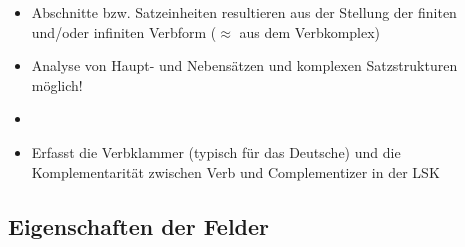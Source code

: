 \begin{frame}

\begin{itemize}
	\item Abschnitte bzw. Satzeinheiten resultieren aus der Stellung der finiten und/oder infiniten Verbform ($\approx$ aus dem Verbkomplex)
\end{itemize}

\begin{table}
\centering
{}
\end{table}

\end{frame}


\begin{frame}

\begin{itemize}
	\item Analyse von Haupt- und Nebensätzen und komplexen Satzstrukturen möglich!
	\item[]
	\item Erfasst die Verbklammer (typisch für das Deutsche) und
	die Komplementarität zwischen Verb und Complementizer in der LSK
\end{itemize}

\begin{table}
\centering
{}
\end{table}

\end{frame}


\subsection{Eigenschaften der Felder}


